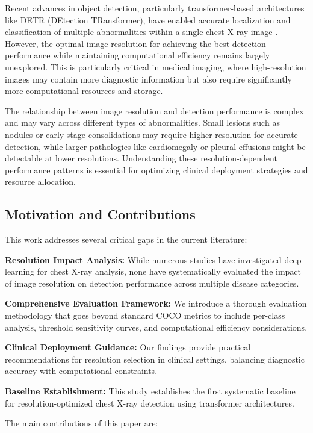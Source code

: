 \documentclass[10pt,twocolumn]{article}
\begin{document}
Recent advances in object detection, particularly transformer-based architectures like DETR (DEtection TRansformer), have enabled accurate localization and classification of multiple abnormalities within a single chest X-ray image \cite{detr,detr_medical}. However, the optimal image resolution for achieving the best detection performance while maintaining computational efficiency remains largely unexplored. This is particularly critical in medical imaging, where high-resolution images may contain more diagnostic information but also require significantly more computational resources and storage.

The relationship between image resolution and detection performance is complex and may vary across different types of abnormalities. Small lesions such as nodules or early-stage consolidations may require higher resolution for accurate detection, while larger pathologies like cardiomegaly or pleural effusions might be detectable at lower resolutions. Understanding these resolution-dependent performance patterns is essential for optimizing clinical deployment strategies and resource allocation.

\subsection{Motivation and Contributions}

This work addresses several critical gaps in the current literature:

\textbf{Resolution Impact Analysis:} While numerous studies have investigated deep learning for chest X-ray analysis, none have systematically evaluated the impact of image resolution on detection performance across multiple disease categories.

\textbf{Comprehensive Evaluation Framework:} We introduce a thorough evaluation methodology that goes beyond standard COCO metrics to include per-class analysis, threshold sensitivity curves, and computational efficiency considerations.

\textbf{Clinical Deployment Guidance:} Our findings provide practical recommendations for resolution selection in clinical settings, balancing diagnostic accuracy with computational constraints.

\textbf{Baseline Establishment:} This study establishes the first systematic baseline for resolution-optimized chest X-ray detection using transformer architectures.

The main contributions of this paper are:
\end{document}

